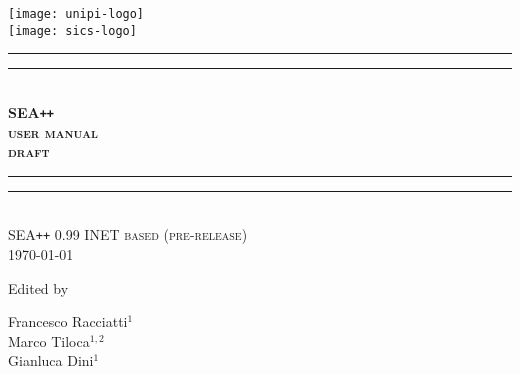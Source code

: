 
{
\centering
\texttt{[image: unipi-logo]}\\[2\baselineskip]
\texttt{[image: sics-logo]}\\[6\baselineskip]

\rule{\textwidth}{1.6pt}\vspace*{-\baselineskip}\vspace*{2pt}
\rule{\textwidth}{0.4pt}\\[\baselineskip]

{
\Large \bfseries SEA\texttt{++}\\[.25\baselineskip]
\scshape user manual\\[.25\baselineskip]
\scshape draft
}\\[0.2\baselineskip]

\rule{\textwidth}{0.4pt}\vspace*{-\baselineskip}\vspace{3.2pt}
\rule{\textwidth}{1.6pt}\\[\baselineskip] 

\scshape
SEA\texttt{++} 0.99 INET based (pre-release)\\[\baselineskip] 
\today
\par 

\vspace*{6\baselineskip}

Edited by \\[\baselineskip]
{Francesco Racciatti$^1$\\ Marco Tiloca$^{1,2}$\\ Gianluca Dini$^1$ \par}

}




